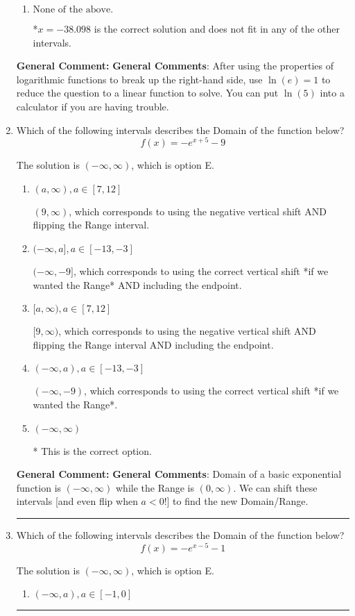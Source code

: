 \documentclass{extbook}[14pt]
\newcommand{\litem}[1]{\item #1

\rule{\textwidth}{0.4pt}}
\begin{document}
\begin{enumerate}
{\begin{enumerate}[label=\Alph*.]
This corresponds to believing you cannot solve the equation.
\item \( \text{None of the above.} \)

*$x = -38.098$ is the correct solution and does not fit in any of the other intervals.
\end{enumerate}

\textbf{General Comment:} \textbf{General Comments}: After using the properties of logarithmic functions to break up the right-hand side, use $\ln(e) = 1$ to reduce the question to a linear function to solve. You can put $\ln(5)$ into a calculator if you are having trouble.
}
\litem{
Which of the following intervals describes the Domain of the function below?
\[ f(x) = -e^{x+5}-9 \]

The solution is \( (-\infty, \infty) \), which is option E.\begin{enumerate}[label=\Alph*.]
\item \( (a, \infty), a \in [7, 12] \)

$(9, \infty)$, which corresponds to using the negative vertical shift AND flipping the Range interval.
\item \( (-\infty, a], a \in [-13, -3] \)

$(-\infty, -9]$, which corresponds to using the correct vertical shift *if we wanted the Range* AND including the endpoint.
\item \( [a, \infty), a \in [7, 12] \)

$[9, \infty)$, which corresponds to using the negative vertical shift AND flipping the Range interval AND including the endpoint.
\item \( (-\infty, a), a \in [-13, -3] \)

$(-\infty, -9)$, which corresponds to using the correct vertical shift *if we wanted the Range*.
\item \( (-\infty, \infty) \)

* This is the correct option.
\end{enumerate}

\textbf{General Comment:} \textbf{General Comments}: Domain of a basic exponential function is $(-\infty, \infty)$ while the Range is $(0, \infty)$. We can shift these intervals [and even flip when $a<0$!] to find the new Domain/Range.
}
\litem{
Which of the following intervals describes the Domain of the function below?
\[ f(x) = -e^{x-5}-1 \]

The solution is \( (-\infty, \infty) \), which is option E.\begin{enumerate}[label=\Alph*.]
\item \( (-\infty, a), a \in [-1, 0] \)


\end{enumerate}}
\end{enumerate}
\end{document}
